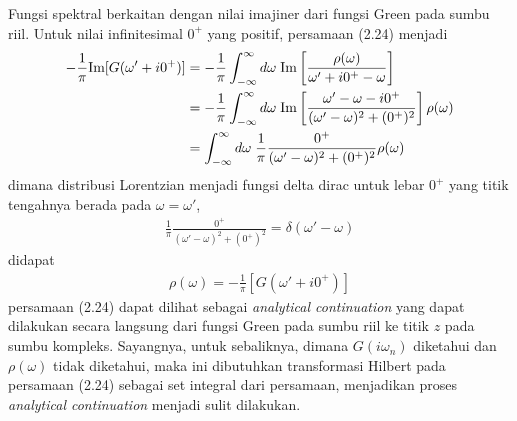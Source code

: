 Fungsi spektral berkaitan dengan nilai imajiner dari fungsi Green pada sumbu riil. Untuk nilai infinitesimal $0^+$ yang positif, persamaan (2.24) menjadi
\begin{align}
- \frac{1}{\pi} \text{Im} [ G(\omega' + i0^+) ] &= -\frac{1}{\pi} \int_{-\infty}^\infty d\omega \; \text{Im} \left[ \frac{\rho(\omega)}{\omega' + i0^+ - \omega}\right]\notag\\
&= - \frac{1}{\pi} \int_{-\infty}^\infty d\omega \; \text{Im} \left[ \frac{\omega' - \omega - i0^+}{(\omega' - \omega)^2 + (0^+)^2} \right] \rho(\omega) \notag\\
&= \int_{-\infty}^{\infty} d\omega \; \frac{1}{\pi} \frac{0^+}{(\omega' - \omega)^2 + (0^+)^2} \rho(\omega)
\end{align}
dimana distribusi Lorentzian menjadi fungsi delta dirac untuk lebar $0^+$ yang titik tengahnya berada pada $\omega = \omega'$, 
\begin{align}
\frac{1}{\pi} \frac{0^+}{(\omega' - \omega)^2 + (0^+)^2} = \delta(\omega' - \omega)
\end{align}
didapat
\begin{align}
\rho(\omega) = - \frac{1}{\pi} [ G(\omega' + i0^+) ]
\end{align}
persamaan (2.24) dapat dilihat sebagai \textit{analytical continuation} yang dapat dilakukan secara langsung dari fungsi Green pada sumbu riil ke titik $z$ pada sumbu kompleks. Sayangnya, untuk sebaliknya, dimana $G(i\omega_n)$ diketahui dan $\rho(\omega)$ tidak diketahui, maka ini dibutuhkan transformasi Hilbert pada persamaan (2.24) sebagai set integral dari persamaan, menjadikan proses \textit{analytical continuation} menjadi sulit dilakukan.

